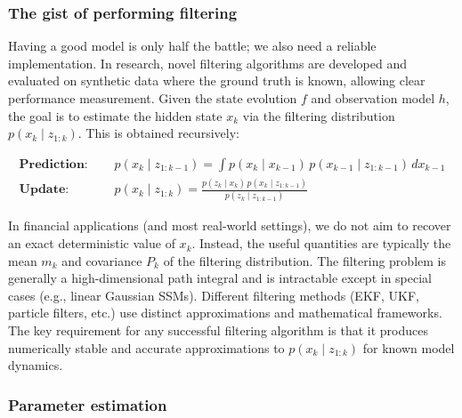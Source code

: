 \documentclass{article}
\begin{document}
\subsubsection{The gist of performing filtering}

Having a good model is only half the battle; we also need a reliable implementation. In research, novel filtering algorithms are developed and evaluated on synthetic data where the ground truth is known, allowing clear performance measurement. Given the state evolution $f$ and observation model $h$, the goal is to estimate the hidden state $x_k$ via the filtering distribution $p(x_k \mid z_{1:k})$. This is obtained recursively:

\begin{equation}
\begin{split}
   \textbf{Prediction: } & \quad p(x_k \mid z_{1:k-1}) = \int p(x_k \mid x_{k-1}) \, p(x_{k-1} \mid z_{1:k-1}) \, dx_{k-1} \\[1ex]
   \textbf{Update: }     & \quad p(x_k \mid z_{1:k}) = \frac{p(z_k \mid x_k) \, p(x_k \mid z_{1:k-1})}{p(z_k \mid z_{1:k-1})}
\end{split}
\end{equation}

In financial applications (and most real-world settings), we do not aim to recover an exact deterministic value of $x_k$. Instead, the useful quantities are typically the mean $m_k$ and covariance $P_k$ of the filtering distribution. The filtering problem is generally a high-dimensional path integral and is intractable except in special cases (e.g., linear Gaussian SSMs). Different filtering methods (EKF, UKF, particle filters, etc.) use distinct approximations and mathematical frameworks. The key requirement for any successful filtering algorithm is that it produces numerically stable and accurate approximations to $p(x_k \mid z_{1:k})$ for known model dynamics.

\subsubsection{Parameter estimation}
\end{document}

